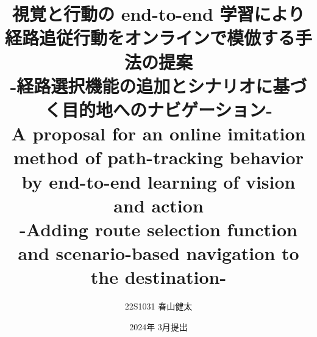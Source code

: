 \documentclass[uplatex, a4paper, 12pt, openany, oneside]{jsbook}
\title{
  \centering
    視覚と行動の end-to-end 学習により経路追従行動をオンラインで模倣する手法の提案\\
-経路選択機能の追加とシナリオに基づく目的地へのナビゲーション-\\
A proposal for an online imitation method of path-tracking behavior by end-to-end learning of vision and action\\
-Adding route selection function and scenario-based navigation to the destination-\\
}
\date{2024年 3月提出}
\author{22S1031  春山健太}
\begin{document}
\frontmatter{}
%

%
\mainmatter{}
%





\backmatter{}
%

%
\end{document}
